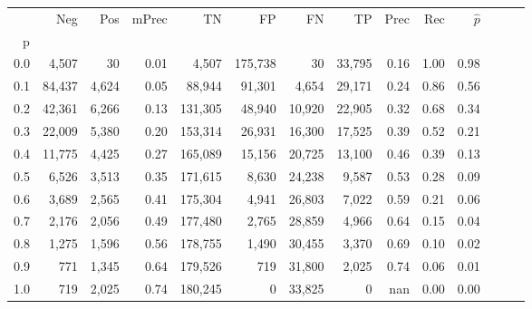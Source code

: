 \begin{tabular}{rrrrrrrrrrrrrr}
\toprule
{} &     Neg &    Pos & mPrec &       TN &       FP &      FN &      TP &  Prec &   Rec & $\hat{p}$ \\
p   &         &        &       &          &          &         &         &       &       &           \\
\midrule
0.0 &   4,507 &     30 &  0.01 &    4,507 &  175,738 &      30 &  33,795 &  0.16 &  1.00 &      0.98 \\
0.1 &  84,437 &  4,624 &  0.05 &   88,944 &   91,301 &   4,654 &  29,171 &  0.24 &  0.86 &      0.56 \\
0.2 &  42,361 &  6,266 &  0.13 &  131,305 &   48,940 &  10,920 &  22,905 &  0.32 &  0.68 &      0.34 \\
0.3 &  22,009 &  5,380 &  0.20 &  153,314 &   26,931 &  16,300 &  17,525 &  0.39 &  0.52 &      0.21 \\
0.4 &  11,775 &  4,425 &  0.27 &  165,089 &   15,156 &  20,725 &  13,100 &  0.46 &  0.39 &      0.13 \\
0.5 &   6,526 &  3,513 &  0.35 &  171,615 &    8,630 &  24,238 &   9,587 &  0.53 &  0.28 &      0.09 \\
0.6 &   3,689 &  2,565 &  0.41 &  175,304 &    4,941 &  26,803 &   7,022 &  0.59 &  0.21 &      0.06 \\
0.7 &   2,176 &  2,056 &  0.49 &  177,480 &    2,765 &  28,859 &   4,966 &  0.64 &  0.15 &      0.04 \\
0.8 &   1,275 &  1,596 &  0.56 &  178,755 &    1,490 &  30,455 &   3,370 &  0.69 &  0.10 &      0.02 \\
0.9 &     771 &  1,345 &  0.64 &  179,526 &      719 &  31,800 &   2,025 &  0.74 &  0.06 &      0.01 \\
1.0 &     719 &  2,025 &  0.74 &  180,245 &        0 &  33,825 &       0 &   nan &  0.00 &      0.00 \\
\bottomrule
\end{tabular}
